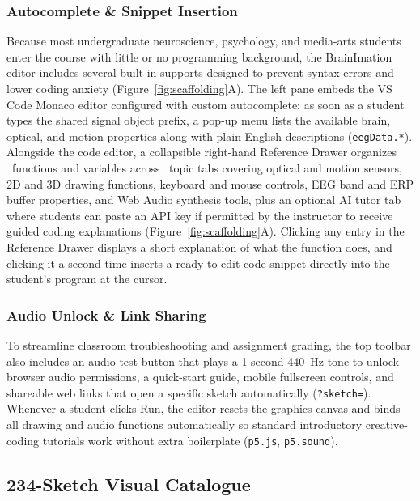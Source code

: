 \documentclass[11pt]{article}
\begin{document}
\subsubsection{Autocomplete \& Snippet Insertion}
Because most undergraduate neuroscience, psychology, and media-arts students enter the course with little or no programming background, the BrainImation editor includes several built-in supports designed to prevent syntax errors and lower coding anxiety \citep{iemi2026icancode} (Figure~\ref{fig:scaffolding}A). The left pane embeds the VS Code Monaco editor configured with custom autocomplete: as soon as a student types the shared signal object prefix, a pop-up menu lists the available brain, optical, and motion properties along with plain-English descriptions (\texttt{eegData.*}). Alongside the code editor, a collapsible right-hand Reference Drawer organizes \NRefAPIs\ functions and variables across \NRefTabs\ topic tabs covering optical and motion sensors, 2D and 3D drawing functions, keyboard and mouse controls, EEG band and ERP buffer properties, and Web Audio synthesis tools, plus an optional AI tutor tab where students can paste an API key if permitted by the instructor to receive guided coding explanations \citep{clindeffarges2026socrates} (Figure~\ref{fig:scaffolding}A). Clicking any entry in the Reference Drawer displays a short explanation of what the function does, and clicking it a second time inserts a ready-to-edit code snippet directly into the student's program at the cursor.

\subsubsection{Audio Unlock \& Link Sharing}
To streamline classroom troubleshooting and assignment grading, the top toolbar also includes an audio test button that plays a 1-second 440~Hz tone to unlock browser audio permissions, a quick-start guide, mobile fullscreen controls, and shareable web links that open a specific sketch automatically (\texttt{?sketch=}). Whenever a student clicks Run, the editor resets the graphics canvas and binds all drawing and audio functions automatically so standard introductory creative-coding tutorials work without extra boilerplate (\texttt{p5.js}, \texttt{p5.sound}).

\subsection{234-Sketch Visual Catalogue}
\end{document}
